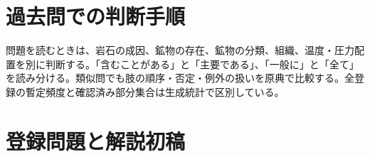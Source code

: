 \section{過去問での判断手順}
問題を読むときは、岩石の成因、鉱物の存在、鉱物の分類、組織、温度・圧力配置を別に判断する。「含むことがある」と「主要である」、「一般に」と「全て」を読み分ける。類似問でも肢の順序・否定・例外の扱いを原典で比較する。全登録の暫定頻度と確認済み部分集合は生成統計で区別している。
\section{登録問題と解説初稿}


